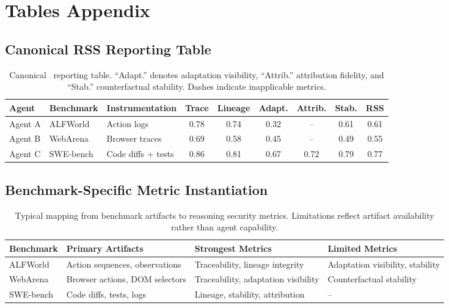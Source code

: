 \section{Tables Appendix}
\label{app:tables}

\subsection{Canonical RSS Reporting Table}

\begin{table}[t]
\centering
\begin{tabular}{l l l c c c c c c}
\toprule
Agent & Benchmark & Instrumentation &
Trace & Lineage & Adapt. & Attrib. & Stab. & RSS \\
\midrule
Agent A & ALFWorld & Action logs
& 0.78 & 0.74 & 0.32 & -- & 0.61 & 0.61 \\
Agent B & WebArena & Browser traces
& 0.69 & 0.58 & 0.45 & -- & 0.49 & 0.55 \\
Agent C & SWE-bench & Code diffs + tests
& 0.86 & 0.81 & 0.67 & 0.72 & 0.79 & 0.77 \\
\bottomrule
\end{tabular}
\caption{Canonical \RSS\ reporting table. ``Adapt.'' denotes adaptation visibility, ``Attrib.'' attribution fidelity, and ``Stab.'' counterfactual stability. Dashes indicate inapplicable metrics.}
\label{tab:rss_full}
\end{table}

\subsection{Benchmark-Specific Metric Instantiation}

\begin{table}[t]
\centering
\begin{tabular}{l l l l}
\toprule
Benchmark & Primary Artifacts & Strongest Metrics & Limited Metrics \\
\midrule
ALFWorld
& Action sequences, observations
& Traceability, lineage integrity
& Adaptation visibility, stability \\
WebArena
& Browser actions, DOM selectors
& Traceability, adaptation visibility
& Counterfactual stability \\
SWE-bench
& Code diffs, tests, logs
& Lineage, stability, attribution
& -- \\
\bottomrule
\end{tabular}
\caption{Typical mapping from benchmark artifacts to reasoning security metrics. Limitations reflect artifact availability rather than agent capability.}
\label{tab:benchmark_subscores}
\end{table}

